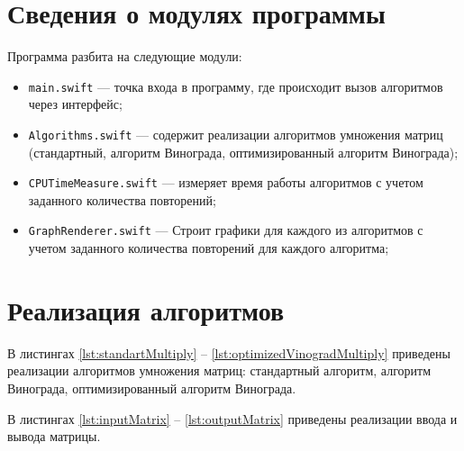 \section{Сведения о модулях программы}

Программа разбита на следующие модули:

\begin{itemize}
	\item \texttt{main.swift} --- точка входа в программу, где происходит вызов алгоритмов через интерфейс;
	\item \texttt{Algorithms.swift} --- содержит реализации алгоритмов умножения матриц (стандартный, алгоритм Винограда, оптимизированный алгоритм Винограда);
	\item \texttt{CPUTimeMeasure.swift} --- измеряет время работы алгоритмов с учетом заданного количества повторений;
	\item \texttt{GraphRenderer.swift} --- Строит графики для каждого из алгоритмов с учетом заданного количества повторений для каждого алгоритма;
\end{itemize}

\section{Реализация алгоритмов}

В листингах \ref{lst:standartMultiply} -- \ref{lst:optimizedVinogradMultiply} приведены реализации алгоритмов умножения матриц: стандартный алгоритм, алгоритм Винограда, оптимизированный алгоритм Винограда.

В листингах \ref{lst:inputMatrix} -- \ref{lst:outputMatrix} приведены реализации ввода и вывода матрицы.

\clearpage


\clearpage


\clearpage

\clearpage


\clearpage

\clearpage


